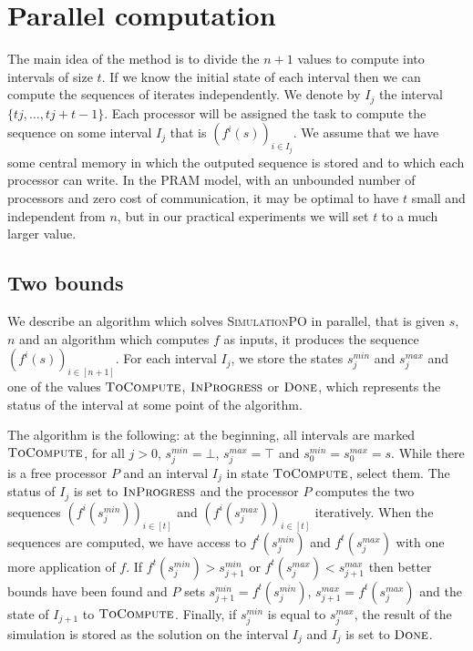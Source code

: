 \documentclass[a4paper,10pt]{article}
\begin{document}
\section{Parallel computation}

The main idea of the method is to divide the $n+1$ values to compute into intervals of size $t$. If we know the initial state of 
each interval then we can compute the sequences of iterates independently.
We denote by $I_j$ the interval $\{tj, \dots, tj + t -1\}$. Each processor will be assigned the task to compute 
the sequence on some interval $I_j$ that is $(f^i(s))_{i \in I_j}$. We assume that we have some central memory in which the outputed sequence is stored and to which each processor can write. In the PRAM model, with an unbounded number of processors and zero cost of communication, it may be optimal to have $t$ small and independent from $n$, but in our practical experiments we will set $t$ to a much larger value.


\subsection{Two bounds}

We describe an algorithm which solves \textsc{SimulationPO} in parallel, that is given $s$, $n$ and an algorithm which computes $f$ as inputs, it produces the sequence  $(f^i(s))_{i\in [n+1]}$. For each interval $I_j$, we store the states $s_j^{min}$ and $s_j^{max}$ and one of the values $\textsc{ToCompute}$, $\textsc{InProgress}$ or $\textsc{Done}$, which represents the status of the interval at some point of the algorithm. 

The algorithm is the following: at the beginning, all intervals are marked $\textsc{ToCompute}$, for all $j >0$, 
$s_j^{min} = \bot$, $s_j^{max} = \top$ and $s_0^{min} = s_0^{max} = s$. 
While there is a free processor $P$ and an interval $I_j$ in state $\textsc{ToCompute}$, select them. 
The status of $I_j$ is set to $\textsc{InProgress}$ and the processor $P$ computes the two sequences $(f^i(s_j^{min}))_{i \in [t]}$ and $(f^i(s_j^{max}))_{i \in [t]}$ iteratively. When the sequences are computed, we have access to $f^t(s_j^{min})$ and 
 $f^t(s_j^{max})$ with one more application of $f$. If $f^t(s_j^{min}) > s_{j+1}^{min}$ or $f^t(s_j^{max}) < s_{j+1}^{max}$ then better bounds have been found and $P$ sets $s_{j+1}^{min} = f^t(s_j^{min})$, $s_{j+1}^{max} = f^t(s_j^{max})$ and the state of $I_{j+1}$ to $\textsc{ToCompute}$.
Finally, if $s_j^{min}$ is equal to $s_j^{max}$, the result of the simulation is stored as the solution on the interval $I_j$
and $I_j$ is set to $\textsc{Done}$.
\end{document}
